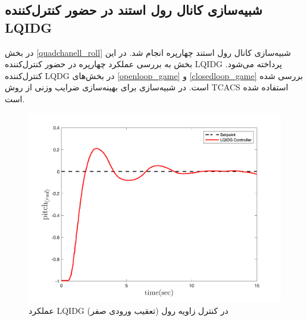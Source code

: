 \subsection{شبیه‌سازی کانال رول استند در حضور کنترل‌کننده LQIDG}\label{roll_lqidg_section}
در بخش
\ref{quadchanell_roll}
شبیه‌سازی کانال رول استند چهارپره انجام شد. در این بخش به بررسی عملکرد چهارپره در حضور کنترل‌کننده LQIDG پرداخته می‌شود. کنترل‌کننده LQDG در بخش‌های
\ref{openloop_game}
و
\ref{closedloop_game}
بررسی شده است.
 در شبیه‌سازی برای بهینه‌سازی ضرایب وزنی از روش
TCACS \cite{Karimi2010}
استفاده شده است.
\

\begin{figure}[H]
	\includegraphics[width=.6\linewidth]{../Figures/Calibration/LQIDG/Pitch/lqidg_pitch.png}
	\centering
	\caption{عملكرد LQIDG در کنترل زاويه رول (تعقیب ورودی صفر)}
\end{figure}


